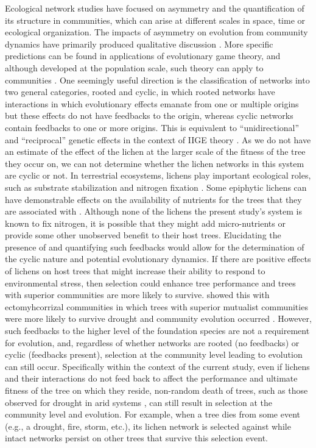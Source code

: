 \documentclass[fleqn,12pt]{olplainarticle}
\begin{document}
Ecological network studies have focused on asymmetry and the
quantification of its structure in communities, which can arise at
different scales in space, time or ecological organization. The
impacts of asymmetry on evolution from community dynamics have
primarily produced qualitative discussion \citep{Bascompte2006,
  Diaz-Castelazo2010, Guimaraes2011, Thompson2013}. More specific
predictions can be found in applications of evolutionary game theory,
and although developed at the population scale, such theory can apply
to communities \citep{Lieberman2005EvolutionaryGraphs}. One seemingly
useful direction is the classification of networks into two general
categories, rooted and cyclic, in which rooted networks have
interactions in which evolutionary effects emanate from one or
multiple origins but these effects do not have feedbacks to the
origin, whereas cyclic networks contain feedbacks to one or more
origins. This is equivalent to ``unidirectional'' and ``reciprocal''
genetic effects in the context of IIGE theory
\citep{Whitham2020IntraspecificEvolution}. As we do not have an
estimate of the effect of the lichen at the larger scale of the
fitness of the tree they occur on, we can not determine whether the
lichen networks in this system are cyclic or not. In terrestrial
ecosystems, lichens play important ecological roles, such as substrate
stabilization \citep{Root2011BioticWashington} and nitrogen fixation
\citep{Nelson2018LichenHelens}. Some epiphytic lichens can have
demonstrable effects on the availability of nutrients for the trees
that they are associated with \citep{Norby1989NitrogenDioxide}.
Although none of the lichens the present study's system is known to
fix nitrogen, it is possible that they might add micro-nutrients or
provide some other unobserved benefit to their host trees. Elucidating
the presence of and quantifying such feedbacks would allow for the
determination of the cyclic nature and potential evolutionary
dynamics. If there are positive effects of lichens on host trees that
might increase their ability to respond to environmental stress, then
selection could enhance tree performance and trees with superior
communities are more likely to survive.  \cite{Gehring2014PlantChange,
  Gehring2017a} showed this with ectomyhcorrizal communities in which
trees with superior mutualist communities were more likely to survive
drought and community evolution occurred
\citep{Whitham2020IntraspecificEvolution}.  However, such feedbacks to
the higher level of the foundation species are not a requirement for
evolution, and, regardless of whether networks are rooted (no
feedbacks) or cyclic (feedbacks present), selection at the community
level leading to evolution can still occur.  Specifically within the
context of the current study, even if lichens and their interactions
do not feed back to affect the performance and ultimate fitness of the
tree on which they reside, non-random death of trees, such as those
observed for drought in arid systems \cite{Sthultz2009, Gehring2017a},
can still result in selection at the community level and
evolution. For example, when a tree dies from some event (e.g., a
drought, fire, storm, etc.), its lichen network is selected against
while intact networks persist on other trees that survive this
selection event.
\end{document}
